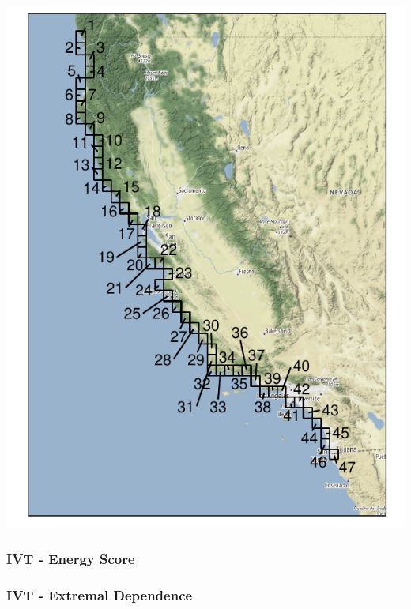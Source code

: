 \documentclass[aspectratio=169,10pt]{beamer}
\newlength{\frametextheight}
\begin{document}
\begin{frame}
\begin{minipage}{.49\textwidth}
    \includegraphics[height=\frametextheight]{./ch1/images/era5_grid}
  \end{minipage}
\end{frame} %

\begin{frame}
  \frametitle{IVT - Energy Score}
  \begin{center}
    
  \end{center}
\end{frame} %

\subsubsection{IVT - Extremal Dependence}
\end{document}
